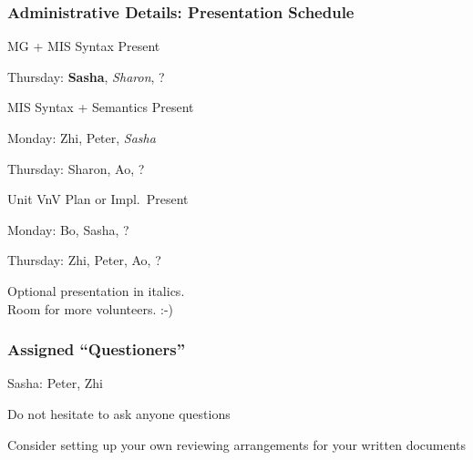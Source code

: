 \documentclass[t,12pt,numbers,fleqn]{beamer}
\begin{document}
\begin{frame}
\frametitle{Administrative Details: Presentation Schedule}

\bi
\item MG + MIS Syntax Present
\bi
\item Thursday: \textbf{Sasha}, \emph{Sharon}, ?
\ei
\item MIS Syntax + Semantics Present
\bi
\item Monday: Zhi, Peter, \emph{Sasha}
\item Thursday:  Sharon, Ao, ?
\ei
\item Unit VnV Plan or Impl.\ Present
\bi
\item Monday: Bo, Sasha, ?
\item Thursday: Zhi, Peter, Ao, ?
\ei
\ei

Optional presentation in italics.\\
Room for more volunteers.  :-)

\end{frame}


\begin{frame}
\frametitle{Assigned ``Questioners''}

\be
\item Sasha: Peter, Zhi
\ee
\bi
\item Do not hesitate to ask anyone questions
\item Consider setting up your own reviewing arrangements for your written
  documents
\ei
\end{frame}

\end{document}
